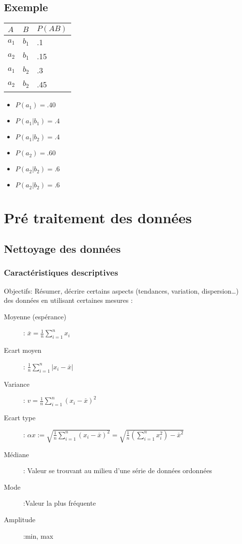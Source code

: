 \section{Exemple}
\begin{multicols}{2}
[]
\begin{tabular}{ll|l}
  \hline
  $A$&$B$&$P(AB)$\\
  \hline
  $a_1$&$b_1$&.1\\
  $a_2$&$b_1$&.15\\
  $a_1$&$b_2$&.3\\
  $a_2$&$b_2$&.45\\
  \hline
\end{tabular}

\begin{itemize}
\item $P(a_1) = .40$
\item $P(a_1|b_1) = .4$
\item $P(a_1|b_2) = .4$
\item $P(a_2) = .60$
\item $P(a_2|b_2) = .6$
\item $P(a_2|b_2) = .6$
\end{itemize}

\end{multicols}

\chapter{Pré traitement des données}
\section{Nettoyage des données}
\subsection{Caractéristiques descriptives}

Objectifs: Résumer, décrire certains aspects (tendances, variation, dispersion…) des données en utilisant certaines mesures :

\begin{center}
\begin{description}
\item[Moyenne (espérance)]: $\overset{\_}{x}=\frac{1}{n} \sum_{i=1}^n x_i$
\item[Ecart moyen]: $\frac{1}{n} \sum_{i=1}^n |x_i - \overset{\_}{x} |$
\item[Variance]: $v = \frac{1}{n} \sum_{i=1}^n (x_i - \overset{\_}{x} )^2$
\item[Ecart type]: $\alpha x := \sqrt{\frac{1}{n} \sum_{i=1}^n (x_i - \overset{\_}{x} )^2} = \sqrt{\frac{1}{n}(\sum_{i=1}^n x_i^2) - \overset{\_}{x}^2 }$
\item[Médiane]: Valeur se trouvant au milieu d’une série de données ordonnées
\item[Mode]:Valeur la plus fréquente 
\item[Amplitude]:min, max
\end{description}
\end{center}

